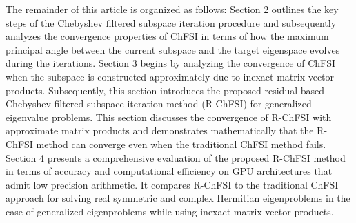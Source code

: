 \documentclass[preprint,3p,number,sort&compress]{elsarticle}
\begin{document}
The remainder of this article is organized as follows: Section 2 outlines the key steps of the Chebyshev filtered subspace iteration procedure and subsequently analyzes the convergence properties of ChFSI in terms of how the maximum principal angle between the current subspace and the target eigenspace evolves during the iterations. Section 3 begins by analyzing the convergence of ChFSI 
when the subspace is constructed approximately due to inexact matrix-vector products. Subsequently, this section introduces the proposed residual-based Chebyshev filtered subspace iteration method (R-ChFSI) for generalized eigenvalue problems. This section discusses the convergence of R-ChFSI with approximate matrix products and demonstrates mathematically that the R-ChFSI method can converge even when the traditional ChFSI method fails. Section 4 presents a comprehensive evaluation of the proposed R-ChFSI method in terms of accuracy and computational efficiency on GPU architectures that admit low precision arithmetic. It compares R-ChFSI to the traditional ChFSI approach for solving real symmetric and complex Hermitian eigenproblems in the case of generalized eigenproblems while using inexact matrix-vector products.
\end{document}
